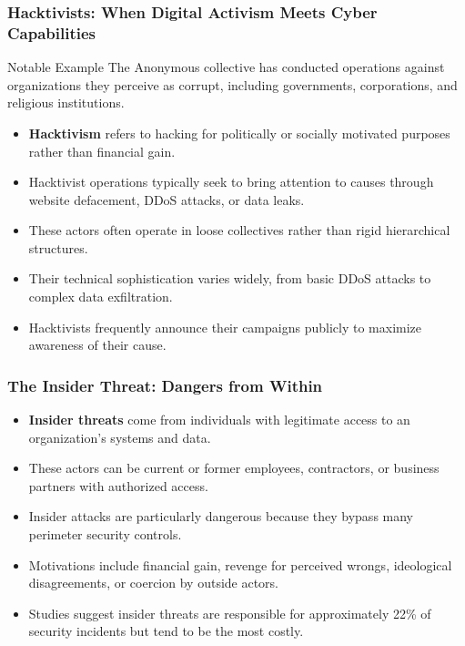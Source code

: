 \documentclass{beamer}
\begin{document}
\begin{frame}
    \frametitle{Hacktivists: When Digital Activism Meets Cyber Capabilities}
    
    \begin{alertblock}{Notable Example}
        The Anonymous collective has conducted operations against organizations they perceive as corrupt, including governments, corporations, and religious institutions.
    \end{alertblock}
    
    \begin{itemize}
        \item \textbf{Hacktivism} refers to hacking for politically or socially motivated purposes rather than financial gain.
        \item Hacktivist operations typically seek to bring attention to causes through website defacement, DDoS attacks, or data leaks.
        \item These actors often operate in loose collectives rather than rigid hierarchical structures.
        \item Their technical sophistication varies widely, from basic DDoS attacks to complex data exfiltration.
        \item Hacktivists frequently announce their campaigns publicly to maximize awareness of their cause.
    \end{itemize}
\end{frame}

\begin{frame}
    \frametitle{The Insider Threat: Dangers from Within}
    
    \begin{itemize}
        \item \textbf{Insider threats} come from individuals with legitimate access to an organization's systems and data.
        \item These actors can be current or former employees, contractors, or business partners with authorized access.
        \item Insider attacks are particularly dangerous because they bypass many perimeter security controls.
        \item Motivations include financial gain, revenge for perceived wrongs, ideological disagreements, or coercion by outside actors.
        \item Studies suggest insider threats are responsible for approximately 22\% of security incidents but tend to be the most costly.
    \end{itemize}
\end{frame}
\end{document}
